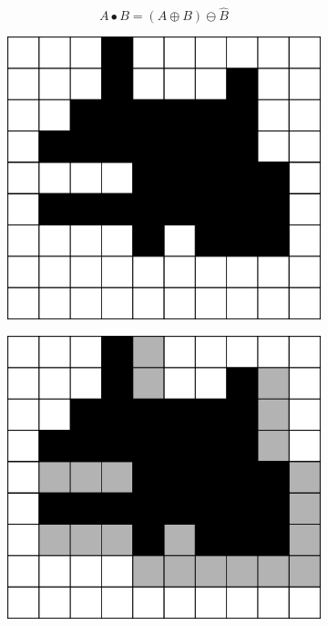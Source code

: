 \documentclass[
  digital,     %
  oneside,     %
  nosansbold,  %
  nocolorbold, %
  lof,         %
  lot,         %
]{fithesis4}
\begin{document}
$$A \bullet B = (A \oplus B) \ominus \hat{B} $$

\begin{figure}
    \begin{subfigure}[t]{0.4\textwidth}
        \centering
        \includegraphics[width=\textwidth]{resources/inkscape/closing_orig.png}
        \caption{}
        \label{fig:closing_orig}
    \end{subfigure}
    \begin{subfigure}[t]{0.4\textwidth}
        \centering
        \includegraphics[width=\textwidth]{resources/inkscape/closing_dilation.png}

\end{subfigure}
\end{figure}
\end{document}
